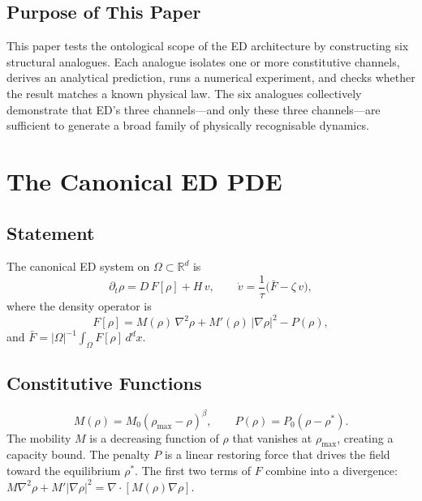 \documentclass[11pt]{article}
\begin{document}
\subsection{Purpose of This Paper}

This paper tests the ontological scope of the ED architecture by constructing six structural analogues. Each analogue isolates one or more constitutive channels, derives an analytical prediction, runs a numerical experiment, and checks whether the result matches a known physical law. The six analogues collectively demonstrate that ED's three channels---and only these three channels---are sufficient to generate a broad family of physically recognisable dynamics.

\section{The Canonical ED PDE}

\subsection{Statement}

The canonical ED system on \(\Omega \subset \mathbb{R}^d\) is
\begin{equation}\label{eq:system}
  \partial_t \rho = D\,F[\rho] + H\,v, \qquad
  \dot{v} = \frac{1}{\tau}\bigl(\bar{F} - \zeta\,v\bigr),
\end{equation}
where the density operator is
\begin{equation}\label{eq:operator}
  F[\rho] = M(\rho)\,\nabla^2\rho + M'(\rho)\,|\nabla\rho|^2 - P(\rho),
\end{equation}
and \(\bar{F} = |\Omega|^{-1}\int_\Omega F[\rho]\,d^d\!x\).

\subsection{Constitutive Functions}

\begin{equation}\label{eq:constitutive}
  M(\rho) = M_0(\rho_{\max} - \rho)^\beta, \qquad
  P(\rho) = P_0(\rho - \rho^*).
\end{equation}
The mobility \(M\) is a decreasing function of \(\rho\) that vanishes at \(\rho_{\max}\), creating a capacity bound. The penalty \(P\) is a linear restoring force that drives the field toward the equilibrium \(\rho^*\). The first two terms of \(F\) combine into a divergence: \(M\nabla^2\rho + M'|\nabla\rho|^2 = \nabla\!\cdot\![M(\rho)\nabla\rho]\).
\end{document}
